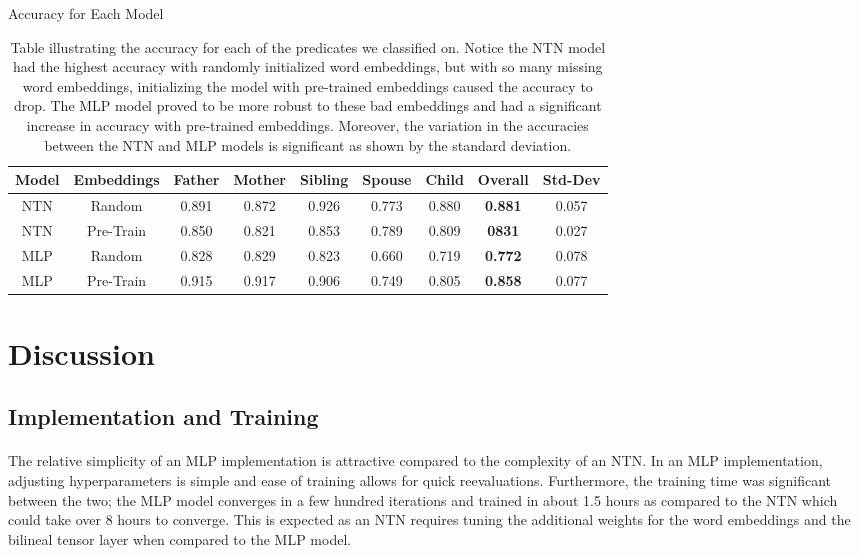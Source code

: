 \documentclass[11.5pt]{article}
\begin{document}
 \begin{table}[h!]
\begin{center}
\begin{large}
Accuracy for Each Model
\end{large}
\begin{tabular}{|cc|ccccc||cc|}
\hline
\textbf{Model} & \textbf{Embeddings} & \textbf{Father} & \textbf{Mother} & \textbf{Sibling} & \textbf{Spouse} & \textbf{Child} & \textbf{ Overall} & \textbf{Std-Dev}\\
\hline
NTN & Random 		&	0.891 	& 0.872 	& 0.926	&	0.773	&  0.880	& \textbf{0.881}	 & 0.057	\\
NTN & Pre-Train 		&	0.850 	& 0.821 	&	0.853	& 0.789	& 0.809 	& \textbf{0831}	& 0.027	\\

MLP & Random 		& 0.828 & 0.829 & 0.823 & 0.660 & 0.719 &  \textbf{0.772}	& 0.078	\\
MLP & Pre-Train 		& 0.915 & 0.917 & 0.906 & 0.749 & 0.805 & \textbf{0.858}	& 0.077	\\
\hline
\end{tabular}
\end{center}
  \caption{\small Table illustrating the accuracy for each of the predicates we classified on. Notice the NTN model had the highest accuracy with randomly initialized word embeddings, but with so many missing word embeddings, initializing the model with pre-trained embeddings caused the accuracy to drop. The MLP model proved to be more robust to these bad embeddings and had a significant increase in accuracy with pre-trained embeddings.  Moreover, the variation in the accuracies between the NTN and MLP models is significant as shown by the standard deviation. }
  \label{accuracy}
\end{table}


\section{Discussion}

\subsection{Implementation and Training}
\paragraph{} The relative simplicity of an MLP implementation is attractive compared to the complexity of an NTN. In an MLP implementation, adjusting hyperparameters is simple and ease of training allows for quick reevaluations. Furthermore, the training time was significant between the two; the MLP model converges in a few hundred iterations and trained in about 1.5 hours as compared to the NTN which could take over 8 hours to converge. This is expected as an NTN requires tuning the additional weights for the word embeddings and the bilineal tensor layer when compared to the MLP model.
\end{document}
